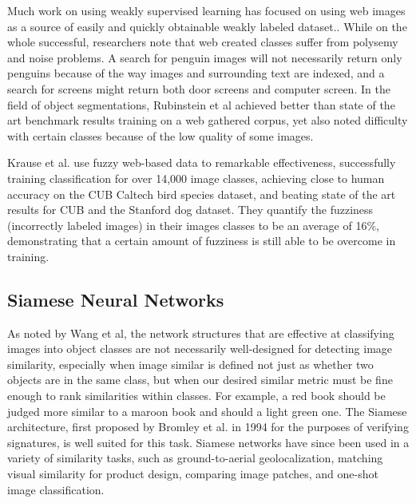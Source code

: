 Much work on using weakly supervised learning has focused on using web images as a source of easily and quickly obtainable weakly labeled dataset.\cite{bergamo2010exploiting}\cite{fergus2010learning}\cite{li2010optimol}\cite{schroff2011harvesting}. While on the whole successful, researchers note that web created classes suffer from polysemy and noise problems. A search for penguin images will not necessarily return only penguins because of the way images and surrounding text are indexed, and a search for screens might return both door screens and computer screen. In the field of object segmentations, Rubinstein et al achieved better than state of the art benchmark results training on a web gathered corpus, yet also noted difficulty with certain classes because of the low quality of some images.\cite{rubinstein2013unsupervised}

Krause et al. use fuzzy web-based data to remarkable effectiveness, successfully training classification for over 14,000 image classes, achieving close to human accuracy on the CUB Caltech bird species dataset, and beating state of the art results for CUB and the Stanford dog dataset\cite{krause2016unreasonable}. They quantify the fuzziness (incorrectly labeled images) in their images classes to be an average of 16\%, demonstrating that a certain amount of fuzziness is still able to be overcome in training. 


\subsection{Siamese Neural Networks}

As noted by Wang et al\cite{wang2014learning}, the network structures that are effective at classifying images into object classes are not necessarily well-designed for detecting image similarity, especially when image similar is defined not just as whether two objects are in the same class, but when our desired similar metric must be fine enough to rank similarities within classes. For example, a red book should be judged more similar to a maroon book and should a light green one. The Siamese architecture, first proposed by Bromley et al. in 1994\cite{bromley1993signature} for the purposes of verifying signatures, is well suited for this task. Siamese networks have since been used in a variety of similarity tasks, such as ground-to-aerial geolocalization\cite{lin2015learning}, matching visual similarity for product design\cite{bell2015learning}, comparing image patches\cite{zagoruyko2015learning}, and one-shot image classification\cite{koch2015siamese}.

